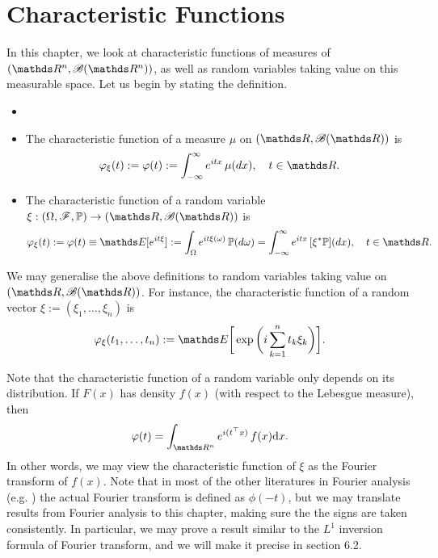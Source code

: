 \section{Characteristic Functions}
In this chapter, we look at characteristic functions of measures of $(\R^n, \B(\R^n))$, as well as random variables taking value on this measurable space. Let us begin by stating the definition.

\begin{definition}
\begin{itemize}
\item[]
\item The characteristic function of a measure $\mu$ on $(\R,\B(\R))$ is 
\begin{equation}
    \varphi_\xi(t) := \varphi(t) := \int_{-\infty}^\infty e^{itx} \, \mu(dx), \quad t \in \R.
\end{equation}
\item The characteristic function of a random variable $\xi: (\Omega, \F, \p) \to (\R, \B(\R))$ is 
\begin{equation}
    \varphi_\xi(t) := \varphi(t) \equiv \E[e^{it\xi}] := \int_\Omega e^{it\xi(\omega)} 
    \, \p(d\omega) = \int_{-\infty}^\infty e^{itx} \, [\xi^*\p](dx), \quad t \in \R.
\end{equation}
\end{itemize}
We may generalise the above definitions to random variables taking value on $(\R, \B(\R))$. For instance, the characteristic function of a random vector $\xi := (\xi_1, \dots, \xi_n)$ is
\begin{equation*}
    \varphi_\xi (t_1, \dots, t_n) := \E\bigg[\exp{\bigg(i\sum_{k=1}^n t_k \xi_k\bigg)}\bigg].
\end{equation*}
\end{definition}
Note that the characteristic function of a random variable only depends on its distribution. If $F(x)$ has density $f(x)$ (with respect to the Lebesgue measure), then
\begin{equation*}
    \varphi(t) = \int_{\R^n}e^{i(t^\top x)} \, f(x) \d x.
\end{equation*}
In other words, we may view the characteristic function of $\xi$ as the Fourier transform of $f(x)$. Note that in most of the other literatures in Fourier analysis (e.g. \cite{PrincetonFourierAnalysis}) the actual Fourier transform is defined as $\phi(-t)$, but we may translate results from Fourier analysis to this chapter, making sure the the signs are taken consistently. In particular, we may prove a result similar to the $L^1$ inversion formula of Fourier transform, and we will make it precise in section 6.2.\\

